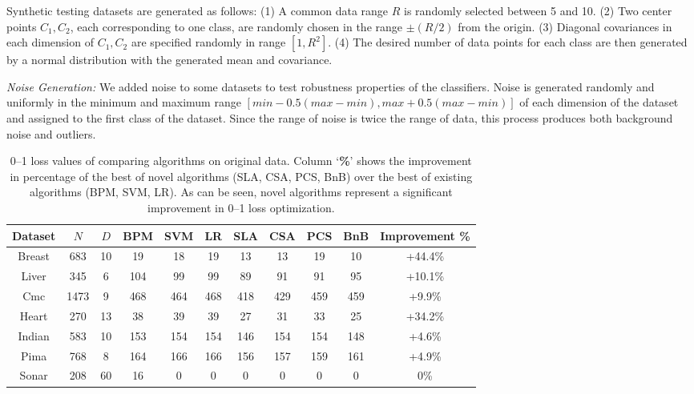 Synthetic testing datasets are generated as follows: (1) A common data
range $R$ is randomly selected between 5 and 10.  (2) Two center points
$C_1, C_2$, each corresponding to one class, are randomly chosen in
the range $\pm (R/2)$ from the origin.  (3) Diagonal covariances in
each dimension of $C_1, C_2$ are specified randomly in range $[1,
  R^2]$.  (4) The desired number of data points for each class are
then generated by a normal distribution with the generated mean
and covariance.

\emph{Noise Generation:} We added noise to some datasets to test
robustness properties of the classifiers.  Noise is generated randomly
and uniformly in the minimum and maximum range $[min -
  0.5(max-min),max + 0.5(max-min)]$ of each dimension of the
dataset and assigned to the first class of the
dataset. Since the range of noise is twice the range of data, this
process produces both background noise and outliers.



\begin{table}[htbp!]
\centering
{\footnotesize 
\begin{tabular}{|c|cc|  ccc|cccc|c|}
\hline\hline
{\bf Dataset} & $N$ & $D$ & {\bf BPM} & {\bf SVM} & {\bf LR} & {\bf SLA} & {\bf CSA} & {\bf PCS} & {\bf BnB} & {\bf Improvement \% }\\ 
\hline 
Breast	& 683 & 10 & 19 & 18 & 19 & 13 		& 13 & 19 & 10 & +44.4\%\\  
Liver	& 345 & 6 & 104 & 99 & 99 & 89 		& 91 & 91 & 95 & +10.1\%\\   
Cmc	& 1473 & 9 & 468 & 464 & 468 & 418 	& 429 & 459 & 459 & +9.9\%\\   
Heart  	& 270 & 13 & 38 & 39 & 39 & 27 		& 31 & 33 & 25 & +34.2\%\\  
Indian  & 583 & 10 & 153 & 154 & 154 & 146 	& 154 & 154 & 148 & +4.6\%\\    
Pima 	& 768 & 8  & 164 & 166 & 166 & 156 	& 157 & 159 & 161 & +4.9\%\\    
Sonar  	& 208 & 60 & 16 & 0 & 0 & 0 			& 0 & 0 & 0 & 0\%\\ 
\hline
\end{tabular}}
\caption{0--1 loss values of comparing algorithms on original
  data. Column `{\bf \%}' shows the improvement in percentage of the
  best of novel algorithms (SLA, CSA, PCS, BnB) over the best of
  existing algorithms (BPM, SVM, LR). As can be seen, novel algorithms
  represent a significant improvement in 0--1 loss optimization.}
\label{tab:losses0noise}
\end{table}

